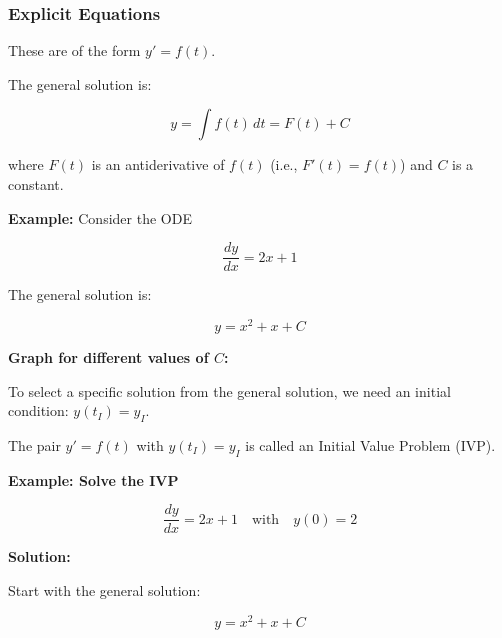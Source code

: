 \documentclass{article}
\begin{document}
\subsubsection*{Explicit Equations}

These are of the form \( y' = f(t) \).

The general solution is:

\[
y = \int f(t) \, dt = F(t) + C
\]

where \( F(t) \) is an antiderivative of \( f(t) \) (i.e., \( F'(t) = f(t) \)) and \( C \) is a constant.

\textbf{Example:} Consider the ODE

\[
\frac{dy}{dx} = 2x + 1
\]

The general solution is:

\[
y = x^2 + x + C
\]

\textbf{Graph for different values of \( C \):}

\begin{center}
\end{center}

To select a specific solution from the general solution, we need an initial condition: \( \boxed{y(t_I) = y_I} \).

The pair \( y' = f(t) \) with \( y(t_I) = y_I \) is called an Initial Value Problem (IVP).

\textbf{Example: Solve the IVP}

\[
\frac{dy}{dx} = 2x + 1 \quad \text{with} \quad y(0) = 2
\]

\textbf{Solution:}

Start with the general solution:

\[
y = x^2 + x + C
\]
\end{document}
